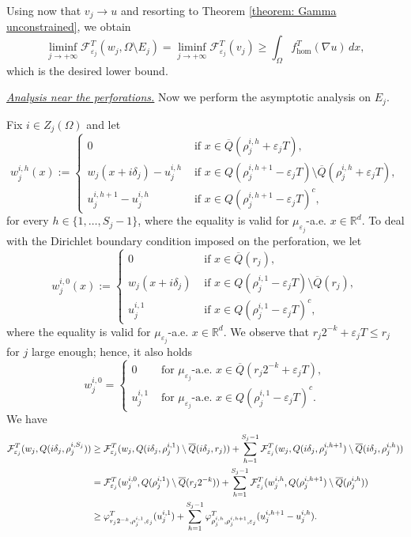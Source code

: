 \documentclass{article}
\theoremstyle{plain}
\theoremstyle{definition}
\def\rr{{\mathbb R}}
\newcommand{\f}{\varphi}
\newcommand{\ej}{\varepsilon_j}
\newcommand{\rj}{r_j}
\newcommand{\dej}{\delta_j}
\newcommand{\F}{\mathcal{F}}
\numberwithin{equation}{section}
\begin{document}
Using now that $v_j\to u$ and resorting to Theorem \ref{theorem: Gamma unconstrained}, we obtain
        \begin{equation}\label{estimate far from the ps} 
\liminf_{j\to+\infty} \F^{T}_{\varepsilon_j}(w_j,\Omega\setminus E_j)=\liminf_{j\to+\infty}\mathcal{F}^{T}_{\varepsilon_{j}}(v_{j}) \geq \int_{\Omega}f^T_{\hom}(\nabla u)\, dx,
\end{equation}
which is the desired lower bound.
\smallskip 

\underline{{\it Analysis near the perforations.}} Now we perform the asymptotic analysis on $E_j$.

Fix $i\in Z_j(\Omega)$ and let \begin{equation*}
    w^{i,h}_j(x):=
    \begin{cases}
    0 & \text{ if }x \in \overline{Q}(\rho_j^{i,h}+\ej T), \\[2pt]
    w_j(x+i\dej)-u_j^{i,h} & \text{ if }  x \in Q(\rho^{i,h+1}_j-\ej T)\setminus \overline{Q}(\rho_j^{i,h}+\ej T), \\[3pt]
    u_j^{i,h+1}-u_j^{i,h} & \text{ if } x\in  Q(\rho^{i,h+1}_j-\ej T)^c,
    \end{cases}
\end{equation*}
for every $h\in\{1,\dots,S_j-1\}$, where the equality is valid for $\mu_{\ej}$-a.e. $x\in\rr^d$. To deal with the Dirichlet boundary condition imposed on the perforation, we let
\begin{equation*}
    w^{i,0}_j(x):=
    \begin{cases}
    0 & \text{ if } x\in \overline{Q}(\rj), \\[2pt]
    w_j(x+i\dej) & \text{ if }  x\in Q(\rho^{i,1}_j-\ej T)\setminus \overline{Q}(\rj), \\[3pt]
    u_j^{i,1} & \text{ if } x\in  Q(\rho^{i,1}_j-\ej T)^c,
    \end{cases}
\end{equation*}
 where the equality is valid for $\mu_{\ej}$-a.e. $x\in\rr^d$. We observe that $\rj2^{-k}+\ej T \leq\rj $ for $j$ large enough; hence, it also holds
\begin{equation*}
    w_j^{i,0}=
    \begin{cases}
    0 & \text{ for } \mu_{\ej}\text{-a.e. } x\in \overline{Q}(\rj2^{-k}+\ej T), \\[3pt]
    u_j^{i,1} & \text{ for } \mu_{\ej}\text{-a.e. }  x\in Q(\rho_j^{i,1}-\ej T)^c.
    \end{cases}
\end{equation*}
We have
\begin{align*} \notag
    \F^T_{\ej}(w_j, Q(i\delta_{j},\rho^{i, S_j}_{j}))& \geq  \F^T_{\ej}(w_j, Q(i\dej,\rho_j^{i,1})\setminus \overline{Q}(i\dej, \rj)) + \sum_{h=1}^{S_j-1}  \F^T_{\ej}(w_j, Q(i\dej,\rho_j^{i,h+1})\setminus \overline{Q}(i\dej, \rho_j^{i,h})) \\ \notag
    & = \F^T_{\ej}(w^{i,0}_j, Q(\rho_j^{i,1})\setminus \overline{Q}(\rj2^{-k})) + \sum_{h=1}^{S_j-1}  \F^T_{\ej}(w^{i,h}_j, Q(\rho_j^{i,h+1})\setminus \overline{Q}(\rho_j^{i,h})) \\ 
    & \geq \f^T_{\rj2^{-k}, \rho_j^{i,1},\ej}(u_j^{i,1}) + \sum_{h=1}^{S_j-1} \f^T_{\rho_j^{i,h}, \rho_j^{i,h+1},\ej}(u_j^{i,h+1}-u_j^{i,h}).
\end{align*} 
\end{document}
